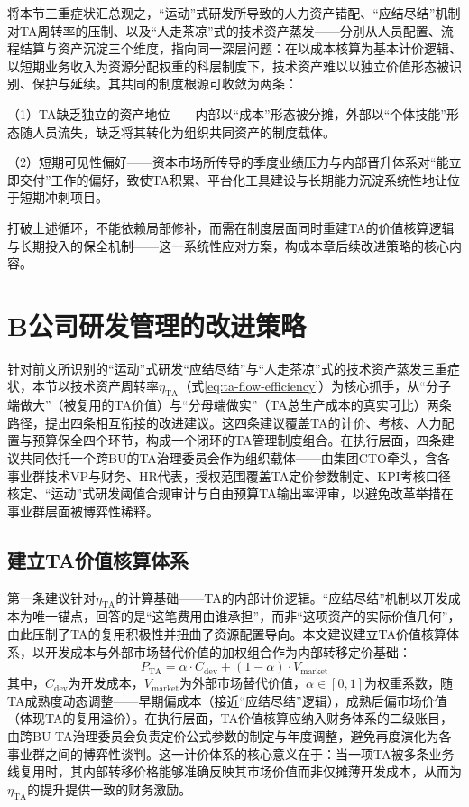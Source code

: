 将本节三重症状汇总观之，“运动”式研发所导致的人力资产错配、“应结尽结”机制对TA周转率的压制、以及“人走茶凉”式的技术资产蒸发——分别从人员配置、流程结算与资产沉淀三个维度，指向同一深层问题：在以成本核算为基本计价逻辑、以短期业务收入为资源分配权重的科层制度下，技术资产难以以独立价值形态被识别、保护与延续。其共同的制度根源可收敛为两条：

（1）TA缺乏独立的资产地位——内部以“成本”形态被分摊，外部以“个体技能”形态随人员流失，缺乏将其转化为组织共同资产的制度载体。

（2）短期可见性偏好——资本市场所传导的季度业绩压力与内部晋升体系对“能立即交付”工作的偏好，致使TA积累、平台化工具建设与长期能力沉淀系统性地让位于短期冲刺项目。

打破上述循环，不能依赖局部修补，而需在制度层面同时重建TA的价值核算逻辑与长期投入的保全机制——这一系统性应对方案，构成本章后续改进策略的核心内容。

\section{B公司研发管理的改进策略}

针对前文所识别的“运动”式研发“应结尽结”与“人走茶凉”式的技术资产蒸发三重症状，本节以技术资产周转率$\eta_{\mathrm{TA}}$（式\eqref{eq:ta-flow-efficiency}）为核心抓手，从“分子端做大”（被复用的TA价值）与“分母端做实”（TA总生产成本的真实可比）两条路径，提出四条相互衔接的改进建议。这四条建议覆盖TA的计价、考核、人力配置与预算保全四个环节，构成一个闭环的TA管理制度组合。在执行层面，四条建议共同依托一个跨BU的TA治理委员会作为组织载体——由集团CTO牵头，含各事业群技术VP与财务、HR代表，授权范围覆盖TA定价参数制定、KPI考核口径核定、“运动”式研发阈值合规审计与自由预算TA输出率评审，以避免改革举措在事业群层面被博弈性稀释。

\subsection{建立TA价值核算体系}
\label{subsec:ta-pricing}

第一条建议针对$\eta_{\mathrm{TA}}$的计算基础——TA的内部计价逻辑。“应结尽结”机制以开发成本为唯一锚点，回答的是“这笔费用由谁承担”，而非“这项资产的实际价值几何”，由此压制了TA的复用积极性并扭曲了资源配置导向。本文建议建立TA价值核算体系，以开发成本与外部市场替代价值的加权组合作为内部转移定价基础：
\begin{equation}
P_{\mathrm{TA}} = \alpha \cdot C_{\mathrm{dev}} + (1-\alpha) \cdot V_{\mathrm{market}}
\label{eq:ta-pricing}
\end{equation}
其中，$C_{\mathrm{dev}}$为开发成本，$V_{\mathrm{market}}$为外部市场替代价值，$\alpha \in [0,1]$为权重系数，随TA成熟度动态调整——早期偏成本（接近“应结尽结”逻辑），成熟后偏市场价值（体现TA的复用溢价）。在执行层面，TA价值核算应纳入财务体系的二级账目，由跨BU TA治理委员会负责定价公式参数的制定与年度调整，避免再度演化为各事业群之间的博弈性谈判。这一计价体系的核心意义在于：当一项TA被多条业务线复用时，其内部转移价格能够准确反映其市场价值而非仅摊薄开发成本，从而为$\eta_{\mathrm{TA}}$的提升提供一致的财务激励。


